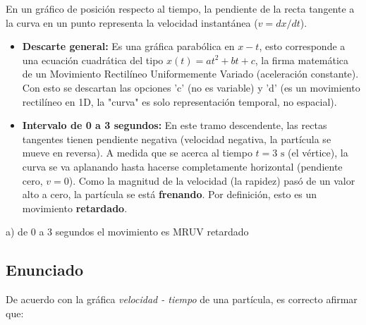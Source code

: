 \documentclass[12pt, a4paper]{article}
\begin{document}
En un gráfico de posición respecto al tiempo, la pendiente de la recta tangente a la curva en un punto representa la velocidad instantánea ($v = dx/dt$). 
\begin{itemize}
    \item \textbf{Descarte general:} Es una gráfica parabólica en $x-t$, esto corresponde a una ecuación cuadrática del tipo $x(t) = at^2 + bt + c$, la firma matemática de un Movimiento Rectilíneo Uniformemente Variado (aceleración constante). Con esto se descartan las opciones 'c' (no es variable) y 'd' (es un movimiento rectilíneo en 1D, la "curva" es solo representación temporal, no espacial).
    \item \textbf{Intervalo de 0 a 3 segundos:} En este tramo descendente, las rectas tangentes tienen pendiente negativa (velocidad negativa, la partícula se mueve en reversa). A medida que se acerca al tiempo $t=3\text{ s}$ (el vértice), la curva se va aplanando hasta hacerse completamente horizontal (pendiente cero, $v=0$). Como la magnitud de la velocidad (la rapidez) pasó de un valor alto a cero, la partícula se está \textbf{frenando}. Por definición, esto es un movimiento \textbf{retardado}.
\end{itemize}

\begin{tcolorbox}[colback=green!5!white, colframe=green!50!black, title=Respuesta Final]
\centering \Large a) de 0 a 3 segundos el movimiento es MRUV retardado
\end{tcolorbox}

\newpage

\subsection*{Enunciado}
De acuerdo con la gráfica \textit{velocidad - tiempo} de una partícula, es correcto afirmar que:

\begin{center}
\end{center}
\end{document}
